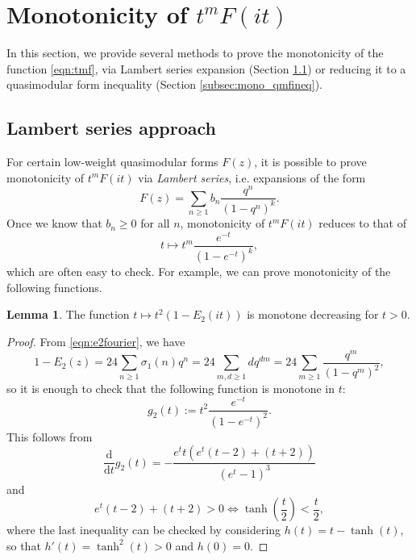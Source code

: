 \documentclass[10pt,reqno]{amsproc}
\newcommand{\dd}{\mathrm{d}}
\newcommand{\1}{\mathds{1}}	%
\theoremstyle{definition}
\newtheorem{lemma}[theorem]{Lemma}
\theoremstyle{remark}
\begin{document}
\section{Monotonicity of $t^m F(it)$}
\label{sec:mono}

In this section, we provide several methods to prove the monotonicity of the function \eqref{eqn:tmf}, via Lambert series expansion (Section \ref{subsec:mono_lambert}) or reducing it to a quasimodular form inequality (Section \ref{subsec:mono_qmfineq}).

\subsection{Lambert series approach}
\label{subsec:mono_lambert}

For certain low-weight quasimodular forms $F(z)$, it is possible to prove monotonicity of $t^m F(it)$ via \emph{Lambert series}, i.e. expansions of the form
\[
F(z) = \sum_{n \ge 1} b_n \frac{q^n}{(1 - q^n)^k}.
\]
Once we know that $b_n \ge 0$ for all $n$, monotonicity of $t^m F(it)$ reduces to that of
\[
t \mapsto t^m \frac{e^{-t}}{(1 - e^{-t})^k},
\]
which are often easy to check.
For example, we can prove monotonicity of the following functions.

\begin{lemma}
    \label{lem:polymod_E2}
    The function $t \mapsto t^2 (1 - E_2(it))$ is monotone decreasing for $t > 0$.
\end{lemma}
\begin{proof}
    From \eqref{eqn:e2fourier}, we have
    \[
    1 - E_2(z) = 24 \sum_{n \ge 1} \sigma_1(n) q^n = 24 \sum_{m, d \ge 1} d q^{dm} = 24 \sum_{m \ge 1} \frac{q^m}{(1 - q^m)^2},
    \]
    so it is enough to check that the following function is monotone in $t$:
    \[
        g_2(t) := t^2 \frac{e^{-t}}{(1 - e^{-t})^2}.
    \]
    This follows from
    \[
    \frac{\dd}{\dd t} g_2(t) = -\frac{e^t t (e^t (t - 2) + (t + 2))}{(e^t - 1)^3}
    \]
    and
    \[
    e^t(t - 2) + (t + 2) > 0 \Leftrightarrow \tanh\left(\frac{t}{2}\right) < \frac{t}{2},
    \]
    where the last inequality can be checked by considering $h(t) = t - \tanh(t)$, so that $h'(t) = \tanh^2(t) > 0$ and $h(0) = 0$.
\end{proof}
\end{document}
